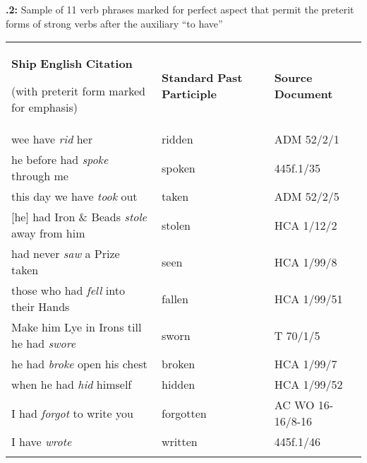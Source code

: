 \textbf{.2:} Sample of 11 verb phrases marked for perfect aspect that permit the preterit forms of strong verbs after the auxiliary “to have”

\begin{tabularx}{\textwidth}{XXX}
\lsptoprule

\textbf{Ship} \textbf{English} \textbf{Citation} 

(with preterit form marked for emphasis) & \textbf{Standard} \textbf{Past} \textbf{Participle} & \textbf{Source} \textbf{Document}\\
wee have \textit{rid} her & ridden & ADM 52/2/1\\
he before had \textit{spoke} through me & spoken & 445f.1/35\\
this day we have \textit{took} out & taken & ADM 52/2/5\\{}
[he] had Iron \& Beads \textit{stole} away from him & stolen & HCA 1/12/2\\
had never \textit{saw} a Prize taken & seen & HCA 1/99/8\\
those who had \textit{fell} into their Hands & fallen & HCA 1/99/51\\
Make him Lye in Irons till he had \textit{swore} & sworn & T 70/1/5\\
he had \textit{broke} open his chest & broken & HCA 1/99/7\\
when he had \textit{hid} himself & hidden & HCA 1/99/52\\
I had \textit{forgot} to write you & forgotten & AC WO 16-16/8-16\\
I have \textit{wrote} & written & 445f.1/46\\
\lspbottomrule
\end{tabularx}
